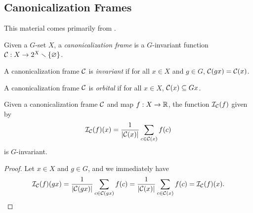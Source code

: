 \subsection{Canonicalization Frames}\label{sec:bg-frame-canonicalization}
This material comes primarily from \cite{ma2024canonicalizationperspectiveinvariantequivariant}.
\begin{definition}
    Given a $G$-set $X$, a \emph{canonicalization frame} is a $G$-invariant function $\mathcal{C} : X \to 2^X \smallsetminus \left\{ \varnothing \right\}$.
\end{definition}

\begin{definition}
    A canonicalization frame $\mathcal{C}$ is \emph{invariant} if for all $x \in X$ and $g \in G$, $\mathcal{C}(gx) = \mathcal{C}(x)$.
\end{definition}

\begin{definition}
    A canonicalization frame $\mathcal{C}$ is \emph{orbital} if for all $x \in X$, $\mathcal{C}(x) \subseteq Gx$.
\end{definition}

\begin{proposition}
    Given a canonicalization frame $\mathcal{C}$ and map $f : X \to \mathbb{R}$, the function $\mathcal{I}_{\mathcal{C}} (f)$ given by
    \[
        \mathcal{I}_{\mathcal{C}} (f) (x)
        = \frac{1}{\left| \mathcal{C}(x) \right|} \sum_{c \in \mathcal{C}(x)} f(c)
    \]
    is $G$-invariant.
    \begin{proof}
        Let $x \in X$ and $g \in G$, and we immediately have
        \[
            \mathcal{I}_{\mathcal{C}} (f) (gx)
            = \frac{1}{\left| \mathcal{C}(gx) \right|} \sum_{c \in \mathcal{C}(gx)} f(c)
            = \frac{1}{\left| \mathcal{C}(x) \right|} \sum_{c \in \mathcal{C}(x)} f(c)
            = \mathcal{I}_{\mathcal{C}} (f) (x).
        \]
    \end{proof}
\end{proposition}

